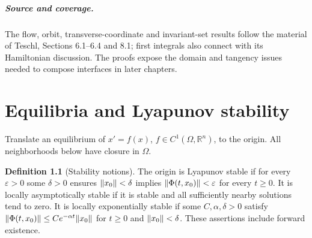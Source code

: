 \documentclass[11pt,oneside]{book}
\theoremstyle{definition}
\newtheorem{definition}[theorem]{Definition}
\theoremstyle{remark}\newtheorem{remark}[theorem]{Remark}
\newcommand{\R}{\mathbb R}\newcommand{\C}{\mathbb C}
\begin{document}
\paragraph{Source and coverage.}
The flow, orbit, transverse-coordinate and invariant-set results follow
the material of Teschl, Sections 6.1--6.4 and 8.1; first integrals also
connect with its Hamiltonian discussion. The proofs expose the domain
and tangency issues needed to compose interfaces in later chapters.



\chapter{Equilibria and Lyapunov stability}\label{ch:d13-12}

Translate an equilibrium of \(x'=f(x)\), \(f\in C^1(\Omega,\R^n)\), to
the origin. All neighborhoods below have closure in \(\Omega\).

\begin{definition}[Stability notions]\label{d13:12:definitions}
The origin is Lyapunov stable if for every \(\varepsilon>0\) some
\(\delta>0\) ensures \(\lVert x_0\rVert<\delta\) implies
\(\lVert\Phi(t,x_0)\rVert<\varepsilon\) for every \(t\ge0\).
It is locally asymptotically stable if it is stable and all sufficiently
nearby solutions tend to zero. It is locally exponentially stable if
some \(C,\alpha,\delta>0\) satisfy
\(\lVert\Phi(t,x_0)\rVert\le Ce^{-\alpha t}\lVert x_0\rVert\) for \(t\ge0\)
and \(\lVert x_0\rVert<\delta\). These assertions include forward existence.
\end{definition}
\end{document}
